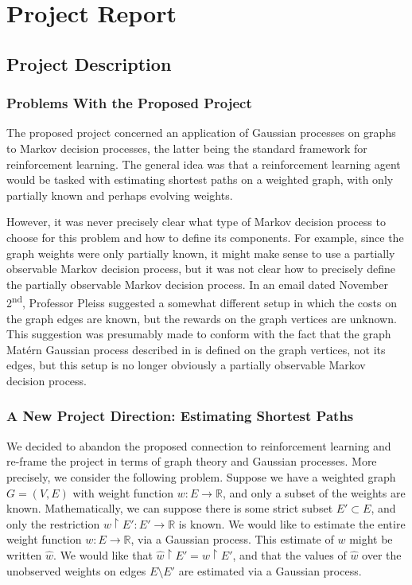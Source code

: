 

\section{Project Report}

\subsection{Project Description}

\subsubsection{Problems With the Proposed Project}

The proposed project concerned an application of Gaussian processes on graphs to Markov decision processes, the latter being the standard framework for reinforcement learning. The general idea was that a reinforcement learning agent would be tasked with estimating shortest paths on a weighted graph, with only partially known and perhaps evolving weights.

However, it was never precisely clear what type of Markov decision process to choose for this problem and how to define its components. For example, since the graph weights were only partially known, it might make sense to use a partially observable Markov decision process, but it was not clear how to precisely define the partially observable Markov decision process. In an email dated November 2\textsuperscript{nd}, Professor Pleiss suggested a somewhat different setup in which the costs on the graph edges are known, but the rewards on the graph vertices are unknown. This suggestion was presumably made to conform with the fact that the graph Mat\'{e}rn Gaussian process described in \cite{pmlr-v130-borovitskiy21a} is defined on the graph vertices, not its edges, but this setup is no longer obviously a partially observable Markov decision process.

\subsubsection{A New Project Direction: Estimating Shortest Paths}

We decided to abandon the proposed connection to reinforcement learning and re-frame the project in terms of graph theory and Gaussian processes. More precisely, we consider the following problem. Suppose we have a weighted graph $G = (V, E)$ with weight function $w \colon E \to \mathbb R$, and only a subset of the weights are known. Mathematically, we can suppose there is some strict subset $E' \subset E$, and only the restriction $w \restriction E' \colon E' \to \mathbb R$ is known. We would like to estimate the entire weight function $w \colon E \to \mathbb R$, via a Gaussian process. This estimate of $w$ might be written $\hat w$. We would like that $\hat w \restriction E' = w \restriction E'$, and that the values of $\hat w$ over the unobserved weights on edges $E \setminus E'$ are estimated via a Gaussian process.


